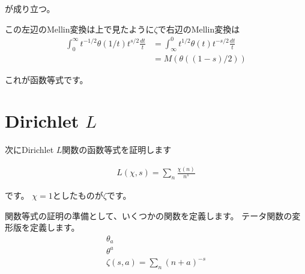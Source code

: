 \documentclass[uplatex, a4paper]{jsarticle}
\begin{document}
が成り立つ。

この左辺のMellin変換は上で見たように$\zeta$で右辺のMellin変換は
\begin{align*}
\int^\infty_0t^{-1/2}\theta(1/t)t^{s/2}\frac{dt}{t}
&=\int^0_\infty t^{1/2}\theta(t)t^{-s/2}\frac{dt}{t}\\
&=M(\theta((1-s)/2))
\end{align*}

これが函数等式です。

\section{Dirichlet $L$}
次にDirichlet $L$関数の函数等式を証明します

\begin{align*}
L(\chi,s)=\sum_n\frac{\chi(n)}{n^s}
\end{align*}

です。
$\chi=1$としたものが$\zeta$です。

関数等式の証明の準備として、いくつかの関数を定義します。
テータ関数の変形版を定義します。
\begin{align*}
\theta_a\\
\theta^a\\
\zeta(s,a)=\sum_n(n+a)^{-s}\\
\end{align*}
\end{document}
